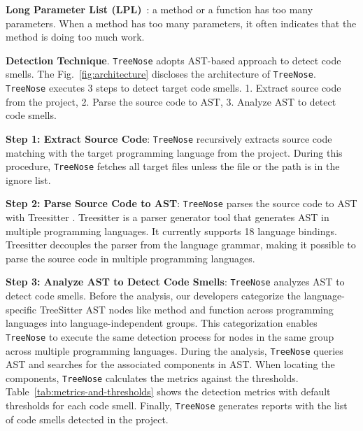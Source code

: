 \textbf{Long Parameter List (LPL)}~\cite{Fowler_Beck}: a method or a function
has too many parameters. When a method has too many parameters, it often
indicates that the method is doing too much work.

{\bf Detection Technique}. \texttt{TreeNose} adopts AST-based approach to detect
code smells. The Fig.~\ref{fig:architecture} discloses the architecture of
\texttt{TreeNose}. \texttt{TreeNose} executes 3 steps to detect target code
smells. 1. Extract source code from the project, 2. Parse the source code to
AST, 3. Analyze AST to detect code smells.

\textbf{Step 1: Extract Source Code}: \texttt{TreeNose} recursively extracts
source code matching with the target programming language from the
project. During this procedure, \texttt{TreeNose} fetches all target files
unless the file or the path is in the ignore list.

\textbf{Step 2: Parse Source Code to AST}: \texttt{TreeNose} parses the source
code to AST with Treesitter \cite{treeSitter}. Treesitter is a parser generator
tool that generates AST in multiple programming languages. It currently
supports 18 language bindings. Treesitter decouples the parser from the
language grammar, making it possible to parse the source code in multiple
programming languages.

\textbf{Step 3: Analyze AST to Detect Code Smells}: \texttt{TreeNose} analyzes
AST to detect code smells. Before the analysis, our developers categorize the
language-specific TreeSitter AST nodes like method and function across
programming languages into language-independent groups. This categorization
enables \texttt{TreeNose} to execute the same detection process for nodes in
the same group across multiple programming languages. During the analysis,
\texttt{TreeNose} queries AST and searches for the associated components in
AST. When locating the components, \texttt{TreeNose} calculates the metrics
against the thresholds. Table~\ref{tab:metrics-and-thresholds} shows the
detection metrics with default thresholds for each code smell. Finally,
\texttt{TreeNose} generates reports with the list of code smells detected in
the project.


